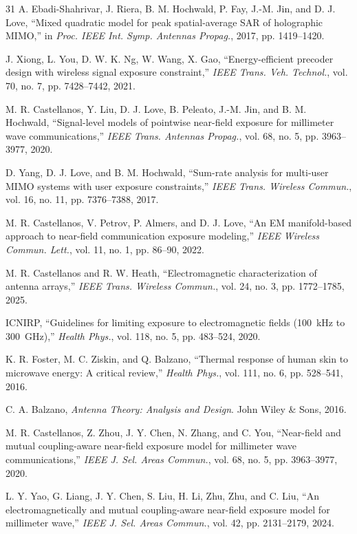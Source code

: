 \documentclass[journal]{IEEEtran}
\begin{document}
\begin{thebibliography}{31}
A. Ebadi-Shahrivar, J. Riera, B. M. Hochwald, P. Fay, J.-M. Jin, and D. J. Love, ``Mixed quadratic model for peak spatial-average SAR of holographic MIMO,'' in \emph{Proc. IEEE Int. Symp. Antennas Propag.}, 2017, pp. 1419--1420.

J. Xiong, L. You, D. W. K. Ng, W. Wang, X. Gao, ``Energy-efficient precoder design with wireless signal exposure constraint,'' \emph{IEEE Trans. Veh. Technol.}, vol. 70, no. 7, pp. 7428--7442, 2021.

M. R. Castellanos, Y. Liu, D. J. Love, B. Peleato, J.-M. Jin, and B. M. Hochwald, ``Signal-level models of pointwise near-field exposure for millimeter wave communications,'' \emph{IEEE Trans. Antennas Propag.}, vol. 68, no. 5, pp. 3963--3977, 2020.

D. Yang, D. J. Love, and B. M. Hochwald, ``Sum-rate analysis for multi-user MIMO systems with user exposure constraints,'' \emph{IEEE Trans. Wireless Commun.}, vol. 16, no. 11, pp. 7376--7388, 2017.

M. R. Castellanos, V. Petrov, P. Almers, and D. J. Love, ``An EM manifold-based approach to near-field communication exposure modeling,'' \emph{IEEE Wireless Commun. Lett.}, vol. 11, no. 1, pp. 86--90, 2022.

M. R. Castellanos and R. W. Heath, ``Electromagnetic characterization of antenna arrays,'' \emph{IEEE Trans. Wireless Commun.}, vol. 24, no. 3, pp. 1772--1785, 2025.

ICNIRP, ``Guidelines for limiting exposure to electromagnetic fields (100~kHz to 300~GHz),'' \emph{Health Phys.}, vol. 118, no. 5, pp. 483--524, 2020.

K. R. Foster, M. C. Ziskin, and Q. Balzano, ``Thermal response of human skin to microwave energy: A critical review,'' \emph{Health Phys.}, vol. 111, no. 6, pp. 528--541, 2016.

C. A. Balzano, \emph{Antenna Theory: Analysis and Design}. John Wiley \& Sons, 2016.

M. R. Castellanos, Z. Zhou, J. Y. Chen, N. Zhang, and C. You, ``Near-field and mutual coupling-aware near-field exposure model for millimeter wave communications,'' \emph{IEEE J. Sel. Areas Commun.}, vol. 68, no. 5, pp. 3963--3977, 2020.

L. Y. Yao, G. Liang, J. Y. Chen, S. Liu, H. Li, Zhu, Zhu, and C. Liu, ``An electromagnetically and mutual coupling-aware near-field exposure model for millimeter wave,'' \emph{IEEE J. Sel. Areas Commun.}, vol. 42, pp. 2131--2179, 2024.


\end{thebibliography}
\end{document}

